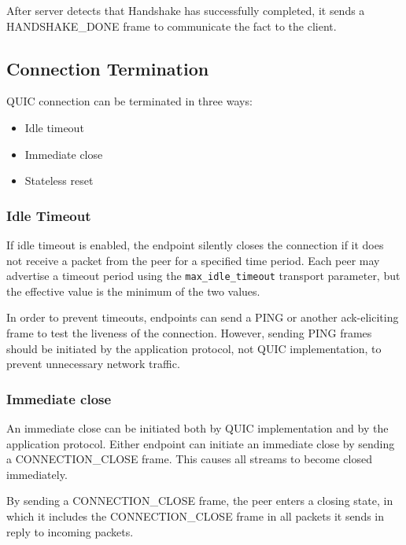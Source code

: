 After server detects that Handshake has successfully completed, it sends a HANDSHAKE\_DONE frame to
communicate the fact to the client.

\subsection{Connection Termination}

QUIC connection can be terminated in three ways:

\begin{itemize}

  \item Idle timeout

  \item Immediate close

  \item Stateless reset

\end{itemize}

\subsubsection{Idle Timeout}\label{sec:idle-timeout}

If idle timeout is enabled, the endpoint silently closes the connection if it does not receive a
packet from the peer for a specified time period. Each peer may advertise a timeout period using the
\texttt{max\_idle\_timeout} transport parameter, but the effective value is the minimum of the two
values.

In order to prevent timeouts, endpoints can send a PING or another ack-eliciting frame to test the
liveness of the connection. However, sending PING frames should be initiated by the application
protocol, not QUIC implementation, to prevent unnecessary network traffic.

\subsubsection{Immediate close}

An immediate close can be initiated both by QUIC implementation and by the application protocol.
Either endpoint can initiate an immediate close by sending a CONNECTION\_CLOSE frame. This causes
all streams to become closed immediately.

By sending a CONNECTION\_CLOSE frame, the peer enters a closing state, in which it includes the
CONNECTION\_CLOSE frame in all packets it sends in reply to incoming packets.

